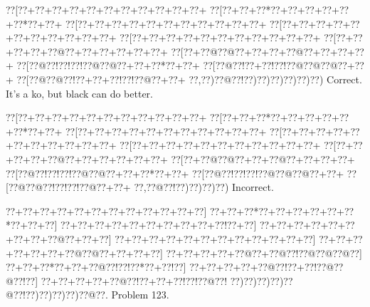 \documentclass[a5paper]{article}
\begin{document}
\begin{center}
{\goo
\0??[\0??+\0??+\0??+\0??+\0??+\0??+\0??+\0??+\0??+\0??+\0??+
\0??[\0??+\0??+\0??*\0??+\0??+\0??+\0??+\0??+\0??*\0??+\0??+
\0??[\0??+\0??+\0??+\0??+\0??+\0??+\0??+\0??+\0??+\0??+\0??+
\0??[\0??+\0??+\0??+\0??+\0??+\0??+\0??+\0??+\0??+\0??+\0??+
\0??[\0??+\0??+\0??+\0??+\0??+\0??+\0??+\0??+\0??+\0??+\0??+
\0??[\0??+\0??+\0??+\0??+\0??@\0??+\0??+\0??+\0??+\0??+\0??+
\0??[\0??+\0??@\0??@\0??+\0??+\0??+\0??@\0??+\0??+\0??+\0??+
\0??[\0??@\0??!\0??!\0??!\0??@\0??@\0??+\0??+\0??*\0??+\0??+
\0??[\0??@\0??!\0??+\0??!\0??!\0??@\0??@\0??@\0??+\0??+
\0??[\0??@\0??@\0??!\0??+\0??+\0??!\0??!\0??@\0??+\0??+
\0??,\0??)\0??@\0??!\0??)\0??)\0??)\0??)\0??)\0??)
}
Correct. It's a ko, but black can do better.

\end{center}
\begin{center}
{\goo
\0??[\0??+\0??+\0??+\0??+\0??+\0??+\0??+\0??+\0??+\0??+\0??+
\0??[\0??+\0??+\0??*\0??+\0??+\0??+\0??+\0??+\0??*\0??+\0??+
\0??[\0??+\0??+\0??+\0??+\0??+\0??+\0??+\0??+\0??+\0??+\0??+
\0??[\0??+\0??+\0??+\0??+\0??+\0??+\0??+\0??+\0??+\0??+\0??+
\0??[\0??+\0??+\0??+\0??+\0??+\0??+\0??+\0??+\0??+\0??+\0??+
\0??[\0??+\0??+\0??+\0??+\0??@\0??+\0??+\0??+\0??+\0??+\0??+
\0??[\0??+\0??@\0??@\0??+\0??+\0??@\0??+\0??+\0??+\0??+
\0??[\0??@\0??!\0??!\0??!\0??@\0??@\0??+\0??+\0??*\0??+\0??+
\0??[\0??@\0??!\0??!\0??!\0??@\0??@\0??@\0??+\0??+
\0??[\0??@\0??@\0??!\0??!\0??!\0??@\0??+\0??+
\0??,\0??@\0??!\0??)\0??)\0??)\0??)
}
Incorrect. 

\end{center}
\newpage
\begin{center}
{\goo
\0??+\0??+\0??+\0??+\0??+\0??+\0??+\0??+\0??+\0??+\0??+\0??]
\0??+\0??+\0??*\0??+\0??+\0??+\0??+\0??+\0??*\0??+\0??+\0??]
\0??+\0??+\0??+\0??+\0??+\0??+\0??+\0??+\0??+\0??!\0??+\0??]
\0??+\0??+\0??+\0??+\0??+\0??+\0??+\0??+\0??@\0??+\0??+\0??]
\0??+\0??+\0??+\0??+\0??+\0??+\0??+\0??+\0??+\0??+\0??+\0??]
\0??+\0??+\0??+\0??+\0??+\0??+\0??@\0??@\0??+\0??+\0??+\0??]
\0??+\0??+\0??+\0??+\0??@\0??+\0??@\0??!\0??@\0??@\0??@\0??]
\0??+\0??+\0??*\0??+\0??+\0??@\0??!\0??!\0??*\0??+\0??!\0??]
\0??+\0??+\0??+\0??+\0??@\0??!\0??+\0??!\0??@\0??@\0??!\0??]
\0??+\0??+\0??+\0??+\0??@\0??!\0??+\0??+\0??!\0??!\0??@\0??!
\0??)\0??)\0??)\0??)\0??@\0??!\0??)\0??)\0??)\0??)\0??@\0??.
}
Problem 123.

\end{center}
\end{document}
